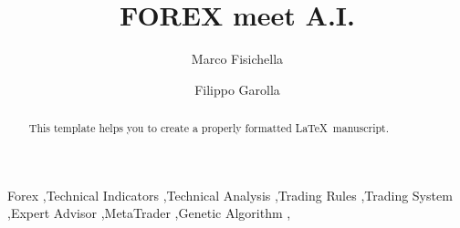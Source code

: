 \documentclass[1p]{elsarticle}
\begin{document}
\begin{frontmatter}

\title{FOREX meet A.I.}


\author[l3s_address]{Marco Fisichella}

\author[filippoaddress]{Filippo Garolla}


\address[l3saddress]{L3S Research Center of Leibniz University of Hannover, Germany}
\address[filippoaddress]{SLR Engineering, Graz, Austria}

\begin{abstract}
This template helps you to create a properly formatted \LaTeX\ manuscript.
\end{abstract}

\begin{keyword}
Forex \sep Technical Indicators \sep Technical Analysis \sep Trading Rules \sep Trading System \sep Expert Advisor \sep MetaTrader \sep Genetic Algorithm \sep 
\end{keyword}

\end{frontmatter}



















\end{document}
